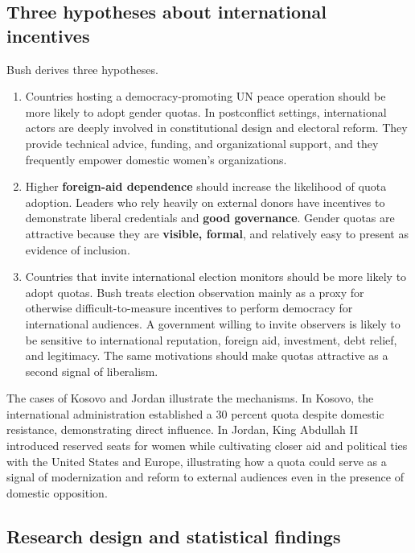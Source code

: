 \subsection{Three hypotheses about international incentives}

Bush derives three hypotheses.
\begin{enumerate}
    \item Countries hosting a democracy-promoting UN peace operation should be more likely to adopt gender quotas. In postconflict settings, international actors are deeply involved in constitutional design and electoral reform. They provide technical advice, funding, and organizational support, and they frequently empower domestic women's organizations.

    \item Higher \textbf{foreign-aid dependence} should increase the likelihood of quota adoption. Leaders who rely heavily on external donors have incentives to demonstrate liberal credentials and \textbf{good governance}. Gender quotas are attractive because they are \textbf{visible, formal}, and relatively easy to present as evidence of inclusion.

    \item Countries that invite international election monitors should be more likely to adopt quotas. Bush treats election observation mainly as a proxy for otherwise difficult-to-measure incentives to perform democracy for international audiences. A government willing to invite observers is likely to be sensitive to international reputation, foreign aid, investment, debt relief, and legitimacy. The same motivations should make quotas attractive as a second signal of liberalism.
\end{enumerate}

The cases of Kosovo and Jordan illustrate the mechanisms. In Kosovo, the international administration established a 30 percent quota despite domestic resistance, demonstrating direct influence. In Jordan, King Abdullah II introduced reserved seats for women while cultivating closer aid and political ties with the United States and Europe, illustrating how a quota could serve as a signal of modernization and reform to external audiences even in the presence of domestic opposition.

\subsection{Research design and statistical findings}

